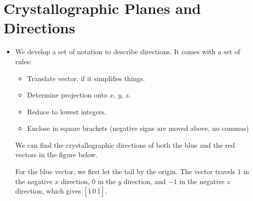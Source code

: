 \section{Crystallographic Planes and Directions}
\begin{itemize}
    \item We develop a set of notation to describe directions. It comes with a set of rules:
    \begin{itemize}
        \item Translate vector, if it simplifies things.
        \item Determine projection onto $x$, $y$, $z$.
        \item Reduce to lowest integers.
        \item Enclose in square brackets (negative signs are moved above, no commas)
    \end{itemize}
    \begin{example}
        We can find the crystallographic directions of both the blue and the red vectors in the figure below.
        \begin{center}
        \end{center}
        For the blue vector, we first let the tail by the origin. The vector travels $1$ in the negative $x$ direction, $0$ in the $y$ direction, and $-1$ in the negative $z$ direction, which gives $[\bar{1}\,0\,\bar{1}]$.
        \vspace{2mm}


\end{example}
\end{itemize}
